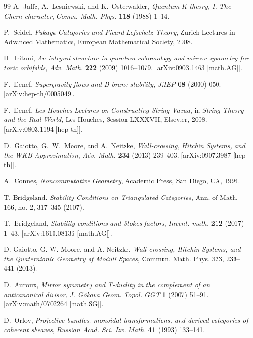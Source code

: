 \documentclass[12pt,reqno]{amsart}
\theoremstyle{remark} \newtheorem{remark}[theorem]{Remark}
\begin{document}
\begin{thebibliography}{99}
 A.~Jaffe, A.~Lesniewski, and K.~Osterwalder,
  \emph{Quantum K-theory, I. The Chern character},
  \emph{Comm. Math. Phys.} \textbf{118} (1988) 1--14.

 P.~Seidel, \emph{Fukaya Categories and
Picard-Lefschetz Theory}, Zurich Lectures in Advanced Mathematics,
  European Mathematical Society, 2008.

 H.~Iritani, \emph{An integral structure in
quantum cohomology and mirror symmetry for toric orbifolds},
  \emph{Adv. Math.} \textbf{222} (2009) 1016--1079.  [arXiv:0903.1463
    [math.AG]].

 F.~Denef, \emph{Supergravity flows and D-brane
stability}, \emph{JHEP} \textbf{08} (2000) 050.
  [arXiv:hep-th/0005049].

 F.~Denef, \emph{Les Houches Lectures on
Constructing String Vacua}, in \emph{String Theory and the Real
World}, Les Houches, Session LXXXVII, Elsevier, 2008.
  [arXiv:0803.1194 [hep-th]].

 D.~Gaiotto, G.~W.~Moore, and A.~Neitzke,
  \emph{Wall-crossing, Hitchin Systems, and the WKB Approximation},
  \emph{Adv. Math.} \textbf{234} (2013) 239--403.  [arXiv:0907.3987
    [hep-th]].

 A.~Connes, \emph{Noncommutative Geometry},
  Academic Press, San Diego, CA, 1994.

 T. Bridgeland.  \textit{Stability Conditions
  on Triangulated Categories}, Ann. of Math. 166, no. 2, 317--345
  (2007).

 T.~Bridgeland, \emph{Stability conditions and
Stokes factors}, \emph{Invent. math.} \textbf{212} (2017) 1--43.
  [arXiv:1610.08136 [math.AG]].


 D. Gaiotto, G. W. Moore, and A. Neitzke.
  \textit{Wall-crossing, Hitchin Systems, and the Quaternionic
    Geometry of Moduli Spaces}, Commun. Math. Phys. 323, 239--441
  (2013).



 D.~Auroux, \emph{Mirror symmetry and T-duality in
the complement of an anticanonical divisor}, \emph{J. G\"{o}kova
Geom. Topol. GGT} \textbf{1} (2007) 51--91.  [arXiv:math/0702264
  [math.SG]].

 D.~Orlov, \emph{Projective bundles, monoidal
transformations, and derived categories of coherent sheaves},
  \emph{Russian Acad. Sci. Izv. Math.} \textbf{41} (1993) 133--141.


\end{thebibliography}
\end{document}

